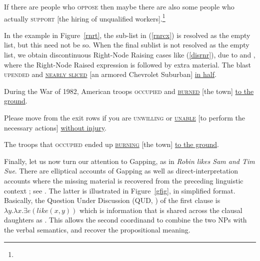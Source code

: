 \ex If there are people who \textsc{oppose} then maybe there are also some
  people who actually \textsc{support}  [the hiring of unqualified
  workers].\footnote{}

\zl




In the example in Figure~\ref{rnrt}, the sub-list  in (\ref{rnrcx}) is resolved as the empty list, but this need not be so. When the final sublist is not resolved as the empty list, we obtain discontinuous Right-Node Raising cases like (\ref{disrnr}), due to  \citet[238--240]{Whitman:09}
and \citet[868]{chavesrnr}, where the Right-Node Raised expression is followed by extra material. 
\eal
\label{disrnr}
\ex The blast \textsc{upended} and \underline{\textsc{nearly sliced}} [an armored Chevrolet Suburban] \underline{in half}.

\ex During the War of 1982, American troops \textsc{occupied}  and \underline{\textsc{burned}} [the town] \underline{to the ground}.

\ex Please move from the exit rows if you are \textsc{unwilling} or \underline{\textsc{unable}}
 [to perform the necessary actions] \underline{without injury}.

\ex The troops that \textsc{occupied} ended up \underline{\textsc{burning}} [the town] \underline{to the ground}.
\zl\label{coord:page-rnr-I-phi-end}\label{coordination:page-rnr-end}


Finally, let us now turn our attention to Gapping, as in 
\emph{Robin likes Sam and Tim \trace{} Sue}.
There are elliptical accounts of Gapping  \citep{chaves06} as well as direct-interpretation accounts where the missing material is recovered from the preceding linguistic context  \citep{Mouret:06,Abeille:Blbie:Mouret:14,sangheepark}; see . The latter is illustrated in Figure~\ref{gfig}, in simplified format. Basically, the Question Under Discussion (QUD, \citealp{roberts96}) of the first clause is $\lambda y.\lambda x. \exists e(like(x,y))$ which is information that is shared across the clausal daughters as .
This allows the second coordinand to combine the two NPs with the verbal semantics, and recover the propositional meaning.



